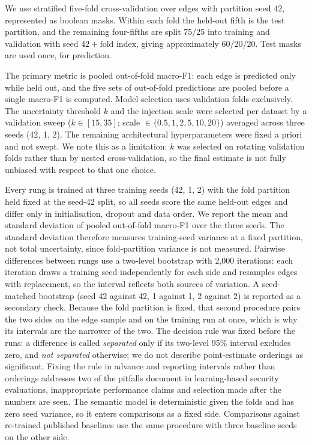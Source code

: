 We use stratified five-fold cross-validation over edges with partition seed 42, represented as
boolean masks. Within each fold the held-out fifth is the test partition, and the remaining
four-fifths are split 75/25 into training and validation with seed $42 + \text{fold index}$,
giving approximately $60/20/20$. Test masks are used once, for prediction.

The primary metric is pooled out-of-fold macro-F1: each edge is predicted only while held out,
and the five sets of out-of-fold predictions are pooled before a single macro-F1 is computed.
Model selection uses validation folds exclusively. The uncertainty threshold $k$ and the
injection scale were selected per dataset by a validation sweep ($k \in [15, 35]$; scale
$\in \{0.5, 1, 2, 5, 10, 20\}$) averaged across three seeds (42, 1, 2). The remaining
architectural hyperparameters were fixed a priori and not swept. We note this as a limitation:
$k$ was selected on rotating validation folds rather than by nested cross-validation, so the
final estimate is not fully unbiased with respect to that one choice.

Every rung is trained at three training seeds (42, 1, 2) with the fold partition held fixed at
the seed-42 split, so all seeds score the same held-out edges and differ only in
initialisation, dropout and data order. We report the mean and standard deviation of pooled
out-of-fold macro-F1 over the three seeds. The standard deviation therefore measures
training-seed variance at a fixed partition, not total uncertainty, since fold-partition
variance is not measured. Pairwise differences between rungs use a two-level bootstrap \citep{efron1994bootstrap} with
2{,}000 iterations: each iteration draws a training seed independently for each side and
resamples edges with replacement, so the interval reflects both sources of variation. A
seed-matched bootstrap (seed 42 against 42, 1 against 1, 2 against 2) is reported as a
secondary check. Because the fold partition is fixed, that second procedure pairs the two sides
on the edge sample and on the training run at once, which is why its intervals are the narrower
of the two. The decision rule was fixed before the runs: a difference is called
\emph{separated} only if its two-level 95\% interval excludes zero, and \emph{not separated}
otherwise; we do not describe point-estimate orderings as significant.  %
Fixing the rule in advance and reporting intervals rather than orderings addresses two of the
pitfalls \citet{arp2022dosdonts} document in learning-based security evaluations, inappropriate
performance claims and selection made after the numbers are seen.
The semantic model is
deterministic given the folds and has zero seed variance, so it enters comparisons as a fixed
side. Comparisons against re-trained published baselines use the same procedure with three
baseline seeds on the other side.

